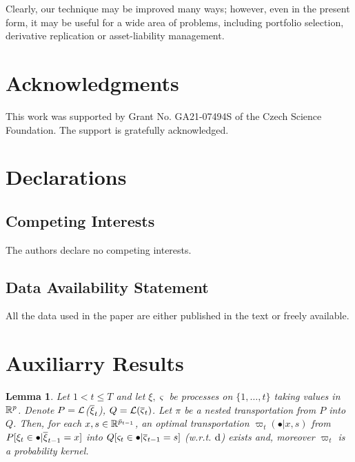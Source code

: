 \documentclass{article}              %
\newtheorem{lemma}{Lemma}
\begin{document}
Clearly, our technique may be improved many ways; however, even in the present form, it may be useful for a wide area of problems, including portfolio selection, derivative replication or asset-liability management. 


\section*{Acknowledgments}

This work was supported by Grant No. GA21-07494S of the Czech Science Foundation. The support is gratefully acknowledged.

\section*{Declarations}

\subsection*{Competing Interests}

The authors declare no competing interests.

\subsection*{Data Availability Statement}

All the data used in the paper are either published in the text or freely available.



%




\appendix

\section{Auxiliarry Results}
 
 
\begin{lemma}
\label{lem:cw}Let $1<t\leq T$ and let $\xi,\varsigma$ be processes on $\{1,\dots,t\}$ taking values in $\mathbb{R}^p$. 
Denote $P=\mathcal{L}$($\overline{\xi}_{t}$), $Q=\mathcal{L}(\overline{\varsigma}_{t})$.
Let $\pi$ be a nested transportation from $P$ into $Q$. Then, for
each $x,s\in\mathbb{R}^{\bar{p}_{t-1}}$, an optimal transportation $\varpi_{t}(\bullet|x,s)$
from $P[\xi_{t}\in\bullet|\overline{\xi}_{t-1}=x]$ into $Q[\varsigma_{t}\in\bullet|\overline{\varsigma}_{t-1}=s]$
(w.r.t. $\mathrm{d}$) exists and, moreover $\varpi_{t}$ is a probability
kernel.
\end{lemma}
\end{document}
